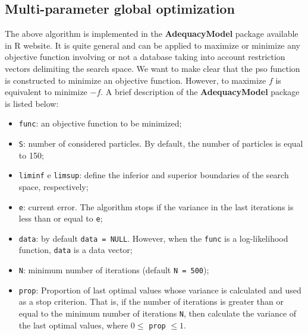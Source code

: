 \documentclass[10pt,letterpaper]{article}
\begin{document}
\subsection{Multi-parameter global optimization}
The above algorithm is implemented in the \textbf{AdequacyModel} package available in \textsc{R} website. It is quite general and can be applied to maximize
or minimize any objective function involving or not a database taking into account restriction vectors delimiting the search space. We want to make clear
that the pso function is constructed to minimize an objective function. However, to maximize $f$ is equivalent to minimize $-f$. A brief description
of the \textbf{AdequacyModel} package is listed below:
\begin{itemize}
	\item \texttt{func}: an objective function to be minimized;
	\item \texttt{S}: number of considered particles. By default, the number of particles is equal to 150;
	\item \texttt{lim\textunderscore inf} e \texttt{lim\textunderscore  sup}: define the inferior and superior boundaries of the search space, res\-pec\-ti\-ve\-ly;
	\item \texttt{e}: current error. The algorithm stops if the variance in the last iterations is less than or equal to \texttt{e};
	\item \texttt{data}: by default \texttt{data = NULL}. However, when the \texttt{func} is a log-likelihood function, \texttt{data} is a data vector;
	\item \texttt{N}: minimum number of iterations (default \texttt{N = 500});
	\item \texttt{prop}: Proportion of last optimal values whose variance is calculated and used as a stop criterion. That is, if the number of iterations is greater than or equal to the minimum number of iterations \texttt{N}, then calculate the variance of the last optimal values, where $0\leq$ \texttt{prop} $\leq 1$.
\end{itemize}
\end{document}
